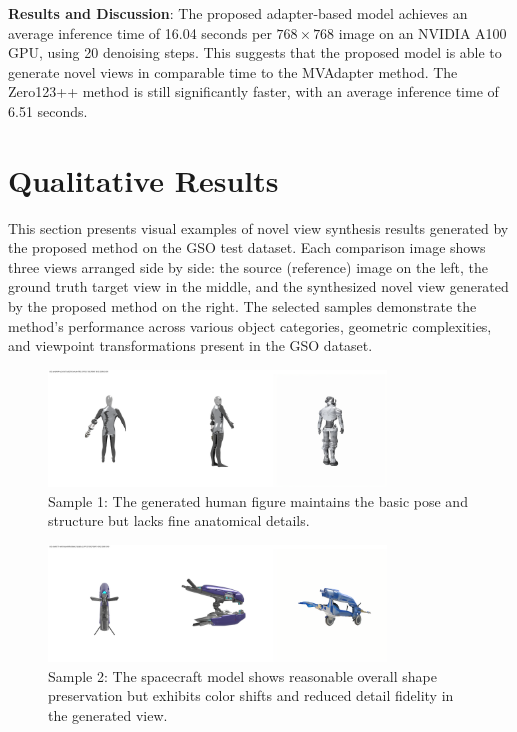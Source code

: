 \textbf{Results and Discussion}: The proposed adapter-based model achieves an average inference time of 16.04 seconds per $768 \times 768$ image on an NVIDIA A100 GPU, using 20 denoising steps. This suggests that the proposed model is able to generate novel views in comparable time to the MVAdapter method. The Zero123++ method is still significantly faster, with an average inference time of 6.51 seconds.

\section{Qualitative Results}\label{sec:exp_qualitative_results}

This section presents visual examples of novel view synthesis results generated by the proposed method on the GSO test dataset. Each comparison image shows three views arranged side by side: the source (reference) image on the left, the ground truth target view in the middle, and the synthesized novel view generated by the proposed method on the right. The selected samples demonstrate the method's performance across various object categories, geometric complexities, and viewpoint transformations present in the GSO dataset.

\begin{figure}[htbp]
  \centering
  \includegraphics[width=0.8\textwidth, trim=0 0 0 20pt, clip]{images/experiments/samples/comparison_batch0124_uid_bc4b4d44-cc3c-5d75-a82f-0c1e4c4a47f9.png}
  \caption{Sample 1: The generated human figure maintains the basic pose and structure but lacks fine anatomical details.}
  \label{fig:sample_1}
\end{figure}

\begin{figure}[htbp]
  \centering
  \includegraphics[width=0.8\textwidth, trim=0 0 0 20pt, clip]{images/experiments/samples/comparison_batch0014_uid_e0a99775-e85f-5dde-89fb-58b9e21b2d0b.png}
  \caption{Sample 2: The spacecraft model shows reasonable overall shape preservation but exhibits color shifts and reduced detail fidelity in the generated view.}
  \label{fig:sample_2}
\end{figure}

